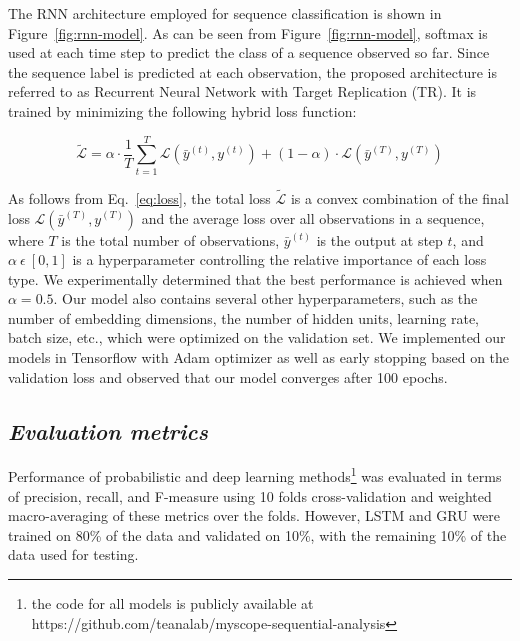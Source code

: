 \documentclass{amia_summit_2018}
\begin{document}
The RNN architecture employed for sequence classification is shown in Figure~\ref{fig:rnn-model}. As can be seen from Figure~\ref{fig:rnn-model}, softmax is used at each time step to predict the class of a sequence observed so far. Since the sequence label is predicted at each observation, the proposed architecture is referred to as Recurrent Neural Network with Target Replication (TR). It is trained by minimizing the following hybrid loss function: 

\begin{equation}
\tilde{\mathcal{L}} = \alpha \cdot \frac{1}{T}\sum_{t=1}^T \mathcal{L}(\bar y^{(t)},y^{(t)}) + (1 - \alpha) \cdot \mathcal{L}(\bar y^{(T)},y^{(T)})
\label{eq:loss}
\end{equation}

As follows from Eq.~\ref{eq:loss}, the total loss $\tilde{\mathcal{L}}$ is a convex combination of the final loss $\mathcal{L}(\bar y^{(T)},y^{(T)})$ and the average loss over all observations in a sequence, where $T$ is the total number of observations, $\bar y^{(t)}$ is the output at step $t$, and $\alpha\ \epsilon\ [0, 1]$ is a hyperparameter controlling the relative importance of each loss type. We experimentally determined that the best performance is achieved when $\alpha=0.5$. Our model also contains several other hyperparameters, such as the number of embedding dimensions, the number of hidden units, learning rate, batch size, etc., which were optimized on the validation set. We implemented our models in Tensorflow with Adam optimizer as well as early stopping based on the validation loss and observed that our model converges after 100 epochs.    
  
\subsection*{\textit{Evaluation metrics}}
Performance of probabilistic and deep learning methods\footnote{the code for all models is publicly available at https://github.com/teanalab/myscope-sequential-analysis} was evaluated in terms of precision, recall, and F-measure using 10 folds cross-validation and weighted macro-averaging of these metrics over the folds. However, LSTM and GRU were trained on 80\% of the data and validated on 10\%, with the remaining 10\% of the data used for testing. 

\end{document}

